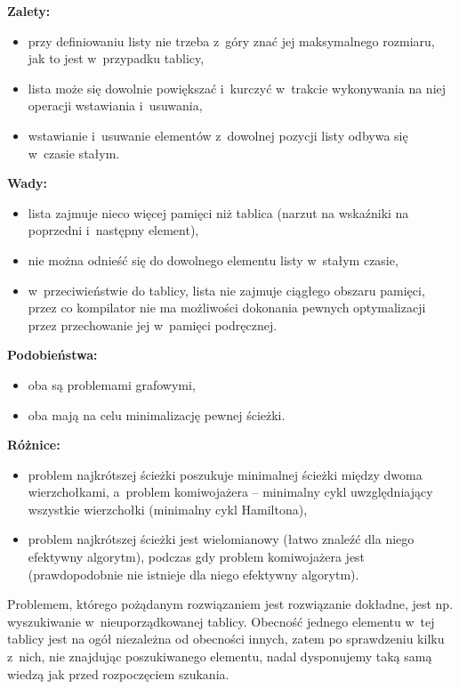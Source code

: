 \bigskip
\noindent\textbf{Zalety:}
\begin{itemize}
	\item przy definiowaniu listy nie trzeba z~góry znać jej maksymalnego rozmiaru, jak to jest w~przypadku tablicy,
	\item lista może się dowolnie powiększać i~kurczyć w~trakcie wykonywania na niej operacji wstawiania i~usuwania,
	\item wstawianie i~usuwanie elementów z~dowolnej pozycji listy odbywa się w~czasie stałym.
\end{itemize}
\textbf{Wady:}
\begin{itemize}
	\item lista zajmuje nieco więcej pamięci niż tablica (narzut na wskaźniki na poprzedni i~następny element),
	\item nie można odnieść się do dowolnego elementu listy w~stałym czasie,
	\item w~przeciwieństwie do tablicy, lista nie zajmuje ciągłego obszaru pamięci, przez co kompilator nie ma możliwości dokonania pewnych optymalizacji przez przechowanie jej w~pamięci podręcznej.
\end{itemize}

\exercise{} %
\noindent\textbf{Podobieństwa:}
\begin{itemize}
	\item oba są problemami grafowymi,
	\item oba mają na celu minimalizację pewnej ścieżki.
\end{itemize}
\textbf{Różnice:}
\begin{itemize}
	\item problem najkrótszej ścieżki poszukuje minimalnej ścieżki między dwoma wierzchołkami, a~problem komiwojażera -- minimalny cykl uwzględniający wszystkie wierzchołki (minimalny cykl Hamiltona),
	\item problem najkrótszej ścieżki jest wielomianowy (łatwo znaleźć dla niego efektywny algorytm), podczas gdy problem komiwojażera jest  (prawdopodobnie nie istnieje dla niego efektywny algorytm).
\end{itemize}

\exercise{} %
Problemem, którego pożądanym rozwiązaniem jest rozwiązanie dokładne, jest np. wyszukiwanie w~nieuporządkowanej tablicy. Obecność jednego elementu w~tej tablicy jest na ogół niezależna od obecności innych, zatem po sprawdzeniu kilku z~nich, nie znajdując poszukiwanego elementu, nadal dysponujemy taką samą wiedzą jak przed rozpoczęciem szukania.

